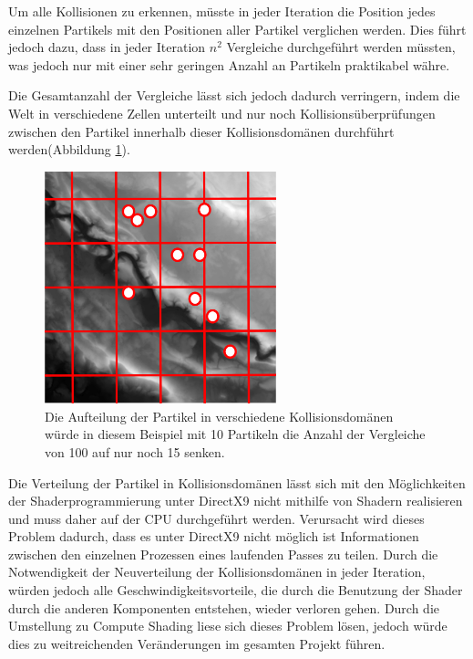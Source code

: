 \begin{Spacing}{\mylinespace}
		Um alle Kollisionen zu erkennen, müsste in jeder Iteration die Position
		jedes einzelnen Partikels mit den Positionen aller Partikel 
		verglichen werden. Dies führt jedoch dazu, dass in jeder Iteration $n^2$
		Vergleiche durchgeführt werden müssten, was jedoch nur mit einer sehr
		geringen Anzahl an Partikeln praktikabel währe.
		
		Die Gesamtanzahl der Vergleiche lässt sich jedoch dadurch verringern, indem
		die Welt in verschiedene Zellen unterteilt und nur noch
		Kollisionsüberprüfungen zwischen den Partikel innerhalb dieser Kollisionsdomänen
		durchführt werden(Abbildung \ref{fig:partdom}).
		\begin{figure}[h!]
			\centering
			\vspace*{30px}
			\includegraphics[width=0.6\textwidth]{graphics/Phys_kp_domain.png}
			\caption{Die Aufteilung der Partikel in verschiedene Kollisionsdomänen würde in diesem Beispiel mit 10 Partikeln die Anzahl der Vergleiche von 100 auf nur noch 15 senken.}
			\label{fig:partdom}
		\end{figure}
		
		Die Verteilung der Partikel in Kollisionsdomänen lässt sich mit den
		Möglichkeiten der Shaderprogrammierung unter DirectX9 nicht mithilfe von
		Shadern realisieren und muss daher auf der CPU durchgeführt werden.
		Verursacht wird dieses Problem dadurch, dass es unter DirectX9 nicht
		möglich ist Informationen zwischen den einzelnen Prozessen eines
		laufenden Passes zu teilen.		
		Durch die Notwendigkeit der Neuverteilung der Kollisionsdomänen in jeder
		Iteration, würden jedoch alle Geschwindigkeitsvorteile, die durch die 
		Benutzung der Shader durch die anderen Komponenten entstehen, wieder
		verloren gehen.
		Durch die Umstellung zu Compute Shading liese sich dieses Problem lösen,
		jedoch würde dies zu weitreichenden Veränderungen im gesamten Projekt
		führen.
		

\end{Spacing}
